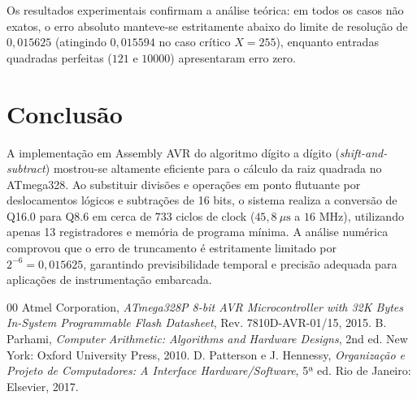\documentclass[conference]{IEEEtran}
\begin{document}
Os resultados experimentais confirmam a análise teórica: em todos os casos não exatos, o erro absoluto manteve-se estritamente abaixo do limite de resolução de $0{,}015625$ (atingindo $0{,}015594$ no caso crítico $X = 255$), enquanto entradas quadradas perfeitas ($121$ e $10000$) apresentaram erro zero.

\section{Conclusão}
A implementação em Assembly AVR do algoritmo dígito a dígito (\textit{shift-and-subtract}) mostrou-se altamente eficiente para o cálculo da raiz quadrada no ATmega328. Ao substituir divisões e operações em ponto flutuante por deslocamentos lógicos e subtrações de 16 bits, o sistema realiza a conversão de Q16.0 para Q8.6 em cerca de $733$ ciclos de clock ($45{,}8\ \mu\text{s}$ a $16\text{ MHz}$), utilizando apenas 13 registradores e memória de programa mínima. A análise numérica comprovou que o erro de truncamento é estritamente limitado por $2^{-6} = 0{,}015625$, garantindo previsibilidade temporal e precisão adequada para aplicações de instrumentação embarcada.

\begin{thebibliography}{00}
	 Atmel Corporation, \textit{ATmega328P 8-bit AVR Microcontroller with 32K Bytes In-System Programmable Flash Datasheet}, Rev. 7810D-AVR-01/15, 2015.
	 B. Parhami, \textit{Computer Arithmetic: Algorithms and Hardware Designs}, 2nd ed. New York: Oxford University Press, 2010.
	 D. Patterson e J. Hennessy, \textit{Organização e Projeto de Computadores: A Interface Hardware/Software}, 5ª ed. Rio de Janeiro: Elsevier, 2017.
\end{thebibliography}
\end{document}

